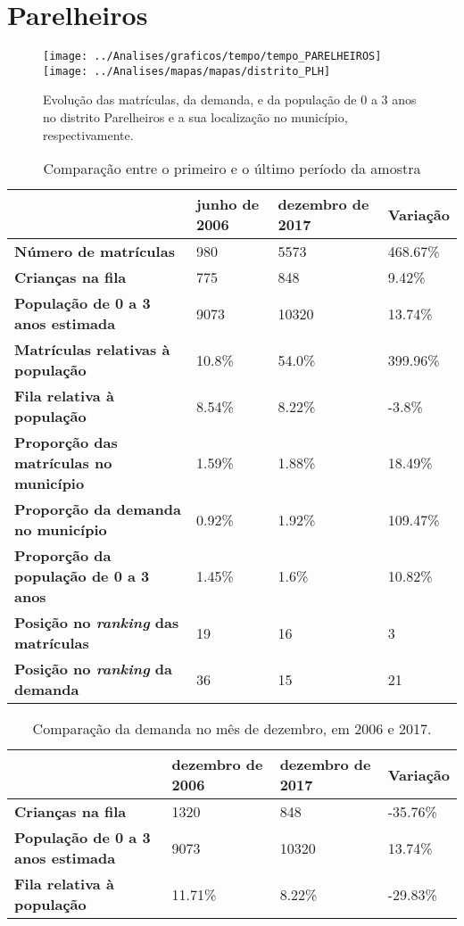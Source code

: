 \section{Parelheiros}
\begin{figure}[H]
\centering
\texttt{[image: ../Analises/graficos/tempo/tempo\_PARELHEIROS]}
\texttt{[image: ../Analises/mapas/mapas/distrito\_PLH]}
\caption{Evolução das matrículas, da demanda, e da população de 0 a 3 anos no distrito Parelheiros e a sua localização no município, respectivamente.}
\end{figure}
\begin{table}[H]
\begin{tabular}{l|l|l|l}
\textbf{}                                      & \textbf{junho de 2006}       & \textbf{dezembro de 2017}    & \textbf{Variação} \\ \hline
\textbf{Número de matrículas}                  & 980 & 5573 & 468.67\% \\ \hline
\textbf{Crianças na fila}                      & 775 & 848 & 9.42\% \\ \hline
\textbf{População de 0 a 3 anos estimada}      & 9073 & 10320 & 13.74\% \\ \hline
\textbf{Matrículas relativas à população}      & 10.8\% & 54.0\% & 399.96\% \\ \hline
\textbf{Fila relativa à população}             & 8.54\% & 8.22\% & -3.8\% \\ \hline
\textbf{Proporção das matrículas no município} & 1.59\% & 1.88\% & 18.49\% \\ \hline
\textbf{Proporção da demanda no município}     & 0.92\% & 1.92\% & 109.47\% \\ \hline
\textbf{Proporção da população de 0 a 3 anos}  & 1.45\% & 1.6\% & 10.82\% \\ \hline
\textbf{Posição no \textit{ranking} das matrículas}     & 19 & 16 & 3 \\ \hline
\textbf{Posição no \textit{ranking} da demanda}         & 36 & 15 & 21 \\ 
\end{tabular}
\caption{Comparação entre o primeiro e o último período da amostra}
\end{table}
\begin{table}[H]
\begin{tabular}{l|l|l|l}
\textbf{}                                 & \textbf{dezembro de 2006} & \textbf{dezembro de 2017} & \textbf{Variação} \\ \hline
\textbf{Crianças na fila}                      & 1320 & 848 & -35.76\% \\ \hline
\textbf{População de 0 a 3 anos estimada}      & 9073 & 10320 & 13.74\% \\ \hline
\textbf{Fila relativa à população}             & 11.71\% & 8.22\% & -29.83\% \\
\end{tabular}
\caption{Comparação da demanda no mês de dezembro, em 2006 e 2017.}
\end{table}
